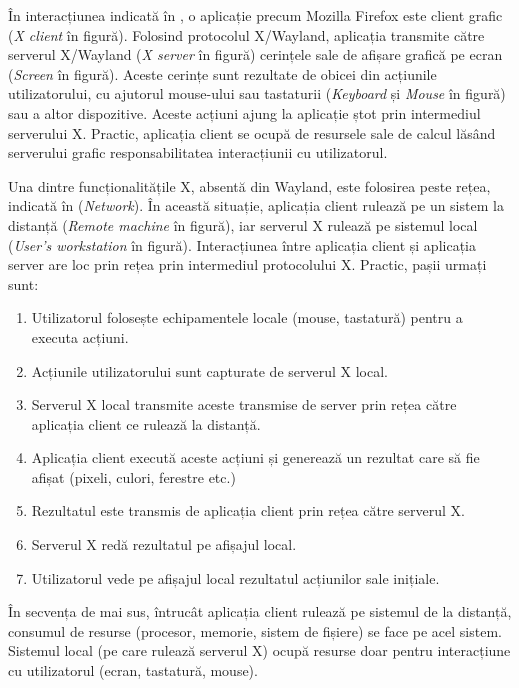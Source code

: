 În interacțiunea indicată în , o aplicație precum Mozilla Firefox este client grafic (\textit{X client} în figură).
Folosind protocolul X/Wayland, aplicația transmite către serverul X/Wayland (\textit{X server} în figură) cerințele sale de afișare grafică pe ecran (\textit{Screen} în figură).
Aceste cerințe sunt rezultate de obicei din acțiunile utilizatorului, cu ajutorul mouse-ului sau tastaturii (\textit{Keyboard} și \textit{Mouse} în figură) sau a altor dispozitive.
Aceste acțiuni ajung la aplicație ștot prin intermediul serverului X.
Practic, aplicația client se ocupă de resursele sale de calcul lăsând serverului grafic responsabilitatea interacțiunii cu utilizatorul.

Una dintre funcționalitățile X, absentă din Wayland, este folosirea peste rețea, indicată în  (\textit{Network}).
În această situație, aplicația client rulează pe un sistem la distanță (\textit{Remote machine} în figură), iar serverul X rulează pe sistemul local (\textit{User's workstation} în figură).
Interacțiunea între aplicația client și aplicația server are loc prin rețea prin intermediul protocolului X.
Practic, pașii urmați sunt:

\begin{enumerate}
  \item Utilizatorul folosește echipamentele locale (mouse, tastatură) pentru a executa acțiuni.
  \item Acțiunile utilizatorului sunt capturate de serverul X local.
  \item Serverul X local transmite aceste transmise de server prin rețea către aplicația client ce rulează la distanță.
  \item Aplicația client execută aceste acțiuni și generează un rezultat care să fie afișat (pixeli, culori, ferestre etc.)
  \item Rezultatul este transmis de aplicația client prin rețea către serverul X.
  \item Serverul X redă rezultatul pe afișajul local.
  \item Utilizatorul vede pe afișajul local rezultatul acțiunilor sale inițiale.
\end{enumerate}

În secvența de mai sus, întrucât aplicația client rulează pe sistemul de la distanță, consumul de resurse (procesor, memorie, sistem de fișiere) se face pe acel sistem.
Sistemul local (pe care rulează serverul X) ocupă resurse doar pentru interacțiune cu utilizatorul (ecran, tastatură, mouse).

